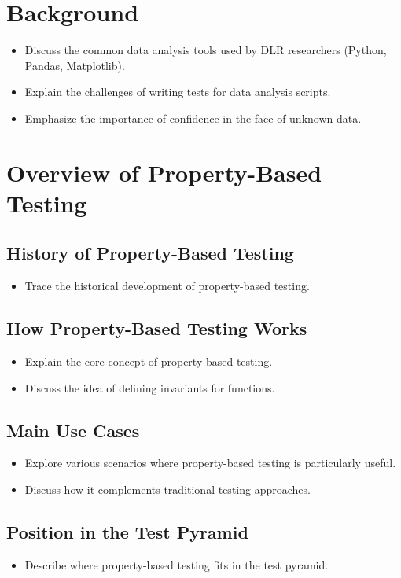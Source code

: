 \documentclass[runningheads]{llncs}
\begin{document}
\section{Background}
\begin{itemize}
  \item Discuss the common data analysis tools used by DLR researchers (Python, Pandas, Matplotlib).
  \item Explain the challenges of writing tests for data analysis scripts.
  \item Emphasize the importance of confidence in the face of unknown data.
\end{itemize}

\section{Overview of Property-Based Testing}
\subsection{History of Property-Based Testing}
\begin{itemize}
  \item Trace the historical development of property-based testing.
\end{itemize}

\subsection{How Property-Based Testing Works}
\begin{itemize}
  \item Explain the core concept of property-based testing.
  \item Discuss the idea of defining invariants for functions.
\end{itemize}

\subsection{Main Use Cases}
\begin{itemize}
  \item Explore various scenarios where property-based testing is particularly useful.
  \item Discuss how it complements traditional testing approaches.
\end{itemize}

\subsection{Position in the Test Pyramid}
\begin{itemize}
  \item Describe where property-based testing fits in the test pyramid.
\end{itemize}
\end{document}
